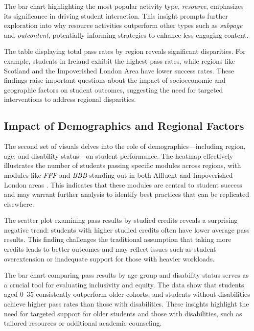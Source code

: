 The bar chart highlighting the most popular activity type, \textit{resource}, emphasizes its significance in driving student interaction. This insight prompts further exploration into why resource activities outperform other types such as \textit{subpage} and \textit{outcontent}, potentially informing strategies to enhance less engaging content.

The table displaying total pass rates by region reveals significant disparities. For example, students in Ireland exhibit the highest pass rates, while regions like Scotland and the Impoverished London Area have lower success rates. These findings raise important questions about the impact of socioeconomic and geographic factors on student outcomes, suggesting the need for targeted interventions to address regional disparities.

\subsection*{Impact of Demographics and Regional Factors}

The second set of visuals delves into the role of demographics—including region, age, and disability status—on student performance. The heatmap effectively illustrates the number of students passing specific modules across regions, with modules like \textit{FFF} and \textit{BBB} standing out in both Affluent and Impoverished London areas \cite{IMD2019}. This indicates that these modules are central to student success and may warrant further analysis to identify best practices that can be replicated elsewhere.

The scatter plot examining pass results by studied credits reveals a surprising negative trend: students with higher studied credits often have lower average pass results. This finding challenges the traditional assumption that taking more credits leads to better outcomes and may reflect issues such as student overextension or inadequate support for those with heavier workloads.

The bar chart comparing pass results by age group and disability status serves as a crucial tool for evaluating inclusivity and equity. The data show that students aged 0--35 consistently outperform older cohorts, and students without disabilities achieve higher pass rates than those with disabilities. These insights highlight the need for targeted support for older students and those with disabilities, such as tailored resources or additional academic counseling.

